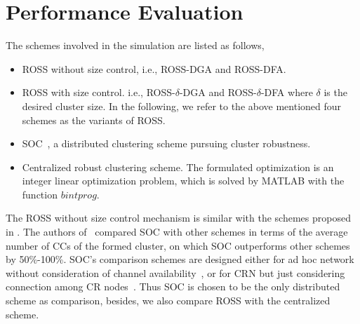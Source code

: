 \documentclass[10pt,journal,compsoc]{IEEEtran}
\theoremstyle{mytheoremstyle}
\theoremstyle{mytheoremstyle}
\theoremstyle{mytheoremstyle}
\newcommand{\ie}{i.e., }
\begin{document}
\section{Performance Evaluation}
\label{performance}
The schemes involved in the simulation are listed as follows,
\begin{itemize}
\item ROSS without size control, \ie ROSS-DGA and ROSS-DFA.
\item ROSS with size control. \ie ROSS-$\delta$-DGA and ROSS-$\delta$-DFA where $\delta$ is the desired cluster size.
In the following, we refer to the above mentioned four schemes as the variants of ROSS.
\item SOC~\cite{LIU_TMC11_2}, a distributed clustering scheme pursuing cluster robustness.
\item Centralized robust clustering scheme. 
The formulated optimization is an integer linear optimization problem, which is solved by MATLAB with the function $bintprog$.
\end{itemize}

The ROSS without size control mechanism is similar with the schemes proposed in \cite{Li11_ROSS}.
The authors of~\cite{LIU_TMC11_2} compared SOC with other schemes in terms of the average number of CCs of the formed cluster, on which SOC outperforms other schemes by 50\%-100\%. 
SOC's comparison schemes are designed either for ad hoc network without consideration of channel availability~\cite{Basagni99}, or for CRN but just considering connection among CR nodes~\cite{Zhao07}. 
Thus SOC is chosen to be the only distributed scheme as comparison, besides, we also compare ROSS with the centralized scheme.
\end{document}
